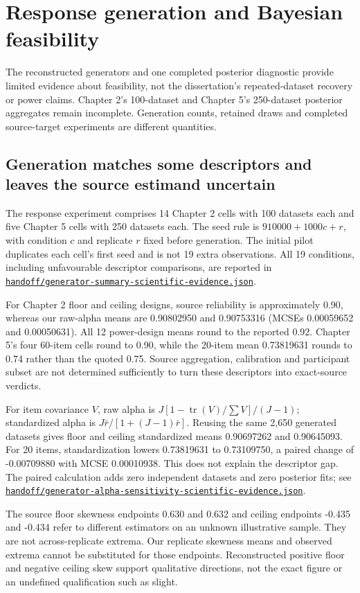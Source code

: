 \documentclass[11pt]{article}
\newcommand{\file}[1]{\href{https://github.com/alectionary/vibe-math/blob/master/formalization/schwabe-psychometric-genetics/#1}{\nolinkurl{#1}}}
\begin{document}
\section{Response generation and Bayesian feasibility}\label{sec:bayes}
The reconstructed generators and one completed posterior diagnostic provide limited evidence about feasibility, not the dissertation's repeated-dataset recovery or power claims. Chapter 2's 100-dataset and Chapter 5's 250-dataset posterior aggregates remain incomplete. Generation counts, retained draws and completed source-target experiments are different quantities.

\subsection{Generation matches some descriptors and leaves the source estimand uncertain}
The response experiment comprises 14 Chapter 2 cells with 100 datasets each and five Chapter 5 cells with 250 datasets each. The seed rule is $910000+1000c+r$, with condition $c$ and replicate $r$ fixed before generation. The initial pilot duplicates each cell's first seed and is not 19 extra observations. All 19 conditions, including unfavourable descriptor comparisons, are reported in \file{handoff/generator-summary-scientific-evidence.json}.

For Chapter 2 floor and ceiling designs, source reliability is approximately 0.90, whereas our raw-alpha means are 0.90802950 and 0.90753316 (MCSEs 0.00059652 and 0.00050631). All 12 power-design means round to the reported 0.92. Chapter 5's four 60-item cells round to 0.90, while the 20-item mean 0.73819631 rounds to 0.74 rather than the quoted 0.75. Source aggregation, calibration and participant subset are not determined sufficiently to turn these descriptors into exact-source verdicts.

For item covariance $V$, raw alpha is $J[1-\operatorname{tr}(V)/\sum V]/(J-1)$; standardized alpha is $J\bar r/[1+(J-1)\bar r]$. Reusing the same 2,650 generated datasets gives floor and ceiling standardized means 0.90697262 and 0.90645093. For 20 items, standardization lowers 0.73819631 to 0.73109750, a paired change of -0.00709880 with MCSE 0.00010938. This does not explain the descriptor gap. The paired calculation adds zero independent datasets and zero posterior fits; see \file{handoff/generator-alpha-sensitivity-scientific-evidence.json}.

The source floor skewness endpoints 0.630 and 0.632 and ceiling endpoints -0.435 and -0.434 refer to different estimators on an unknown illustrative sample. They are not across-replicate extrema. Our replicate skewness means and observed extrema cannot be substituted for those endpoints. Reconstructed positive floor and negative ceiling skew support qualitative directions, not the exact figure or an undefined qualification such as slight.
\end{document}
